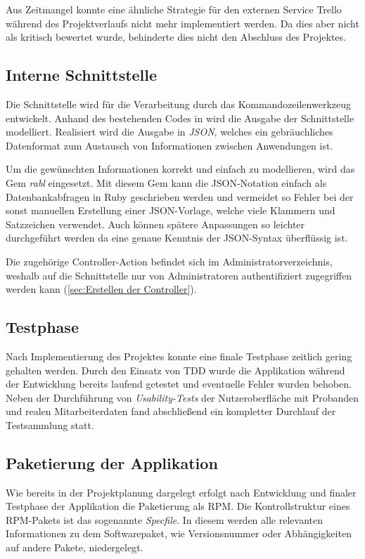 Aus Zeitmangel konnte eine ähnliche Strategie für den externen Service Trello während des
Projektverlaufs nicht mehr implementiert werden. Da dies aber nicht als kritisch bewertet wurde,
behinderte dies nicht den Abschluss des Projektes.

\subsection{Interne Schnittstelle}
\label{sec:Interne Schnittstelle}
Die Schnittstelle wird für die Verarbeitung durch das Kommandozeilenwerkzeug  entwickelt.
Anhand des bestehenden Codes in  wird die Ausgabe der Schnittstelle modelliert.
Realisiert wird die Ausgabe in \textit{\acs{JSON}},
welches ein gebräuchliches Datenformat zum Austausch von Informationen zwischen Anwendungen ist.

Um die gewünschten Informationen korrekt und einfach zu modellieren, wird das Gem \textit{rabl}
eingesetzt. Mit diesem Gem kann die JSON-Notation einfach als Datenbankabfragen in Ruby
geschrieben werden und vermeidet so Fehler bei der sonst manuellen Erstellung einer JSON-Vorlage,
welche viele Klammern und Satzzeichen verwendet. Auch können spätere Anpassungen so leichter
durchgeführt werden da eine genaue Kenntnis der JSON-Syntax überflüssig ist.

Die zugehörige Controller-Action befindet sich im Administratorverzeichnis, weshalb auf die Schnittstelle
nur von Administratoren authentifiziert zugegriffen werden kann (\Vgl \ref{sec:Erstellen der Controller}).

\subsection{Testphase}
\label{sec:Testphase}
Nach Implementierung des Projektes konnte eine finale Testphase zeitlich gering gehalten werden.
Durch den Einsatz von \acs{TDD} wurde die Applikation während der Entwicklung bereits laufend
getestet und eventuelle Fehler wurden behoben. Neben der Durchführung von \textit{Usability-Tests}
der Nutzeroberfläche mit Probanden und realen Mitarbeiterdaten fand abschließend ein kompletter
Durchlauf der Testsammlung statt.

\subsection{Paketierung der Applikation}
\label{sec:Paketierung der Applikation}
Wie bereits in der Projektplanung dargelegt erfolgt nach Entwicklung und finaler Testphase der
Applikation die Paketierung als RPM. Die Kontrollstruktur eines RPM-Pakets ist das sogenannte
\textit{Specfile}. In diesem werden alle relevanten Informationen zu dem Softwarepaket,
wie \bspw Versionsnummer oder Abhängigkeiten auf andere Pakete, niedergelegt.

